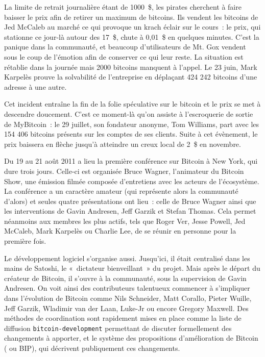 La limite de retrait journalière étant de 1000~\$, les pirates cherchent à faire baisser le prix afin de retirer un maximum de bitcoins. Ils vendent les bitcoins de Jed McCaleb au marché ce qui provoque un krach éclair sur le cours~: le prix, qui stationne ce jour-là autour des 17~\$, chute à 0,01~\$ en quelques minutes. C'est la panique dans la communauté, et beaucoup d'utilisateurs de Mt. Gox vendent sous le coup de l'émotion afin de conserver ce qui leur reste. La situation est rétablie dans la journée mais 2000 bitcoins manquent à l'appel. Le 23 juin, Mark Karpelès prouve la solvabilité de l'entreprise en déplaçant 424 242 bitcoins d'une adresse à une autre.

Cet incident entraîne la fin de la folie spéculative sur le bitcoin et le prix se met à descendre doucement. C'est ce moment-là qu'on assiste à l'escroquerie de sortie de MyBitcoin~: le 29 juillet, son fondateur anonyme, Tom Williams, part avec les 154 406 bitcoins présents sur les comptes de ses clients. Suite à cet évènement, le prix baissera en flèche jusqu'à atteindre un creux local de 2~\$ en novembre.


Du 19 au 21 août 2011 a lieu la première conférence sur Bitcoin à New York, qui dure trois jours. Celle-ci est organisée Bruce Wagner, l'animateur du Bitcoin Show, une émission filmée composée d'entretiens avec les acteurs de l'écosystème. La conférence a un caractère amateur (qui représente alors la communauté d'alors) et seules quatre présentations ont lieu~: celle de Bruce Wagner ainsi que les interventions de Gavin Andresen, Jeff Garzik et Stefan Thomas. Cela permet néanmoins aux membres les plus actifs, tels que Roger Ver, Jesse Powell, Jed McCaleb, Mark Karpelès ou Charlie Lee, de se réunir en personne pour la première fois.

Le développement logiciel s'organise aussi. Jusqu'ici, il était centralisé dans les mains de Satoshi, le «~dictateur bienveillant~» du projet. Mais après le départ du créateur de Bitcoin, il s'ouvre à la communauté, sous la supervision de Gavin Andresen. On voit ainsi des contributeurs talentueux commencer à s'impliquer dans l'évolution de Bitcoin comme Nils Schneider, Matt Corallo, Pieter Wuille, Jeff Garzik, Wladimir van der Laan, Luke-Jr ou encore Gregory Maxwell. Des méthodes de coordination sont rapidement mises en place comme la liste de diffusion \verb?bitcoin-development? permettant de discuter formellement des changements à apporter, et le système des propositions d'amélioration de Bitcoin ( ou BIP), qui décrivent publiquement ces changements.

